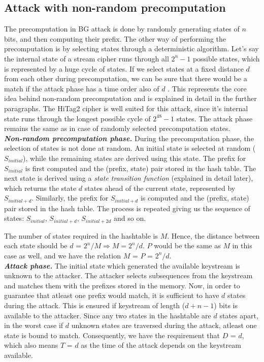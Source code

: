 \subsection{Attack with non-random precomputation}
\label{sec:bg-nr}

The precomputation in BG attack is done by randomly generating states of $n$ bits, and then computing their prefix. The other way of performing the precomputation is by selecting states through a deterministic algorithm. Let's say the internal state of a stream cipher runs through all $2^n - 1$ possible states, which is represented by a huge cycle of states. If we select states at a fixed distance $d$ from each other during precomputation, we can be sure that there would be a match if the attack phase has a time order also of $d$ \cite{erik-discussions}. This represents the core idea behind non-random precomputation and is explained in detail in the further paragraphs. The HiTag2 cipher is well suited for this attack, since it's internal state runs through the longest possible cycle of $2^{48} - 1$ states. The attack phase remains the same as in case of randomly selected precomputation states.\\

\noindent \textit{\textbf{Non-random precomputation phase.}} During the precomputation phase, the selection of states is not done at random. An initial state is selected at random ($S_{initial}$), while the remaining states are derived using this state. The prefix for $S_{initial}$ is first computed and the (prefix, state) pair stored in the hash table. The next state is derived using a \emph{state transition function} (explained in detail later), which returns the state $d$ states ahead of the current state, represented by $S_{initial+d}$. Similarly, the prefix for $S_{initial+d}$ is computed and the (prefix, state) pair stored in the hash table. The process is repeated giving us the sequence of states: $S_{initial}$, $S_{initial+d}$, $S_{initial+2d}$ and so on. 

The number of states required in the hashtable is $M$. Hence, the distance between each state should be $d$ = $2^n/M \Rightarrow M = 2^n/d$. $P$ would be the same as $M$ in this case as well, and we have the relation $M$ = $P$ = $2^n/d$.\\

\noindent \textit{\textbf{Attack phase.}} The initial state which generated the available keystream is unknown to the attacker. The attacker selects subsequences from the keystream and matches them with the prefixes stored in the memory. Now, in order to guarantee that atleast one prefix would match, it is sufficient to have $d$ states during the attack. This is ensured if keystream of length ($d + n - 1$) bits is available to the attacker. Since any two states in the hashtable are $d$ states apart, in the worst case if $d$ unknown states are traversed during the attack, atleast one state is bound to match. Consequently, we have the requirement that $D$ = $d$, which also means $T$ = $d$ as the time of the attack depends on the keystream available.\\

